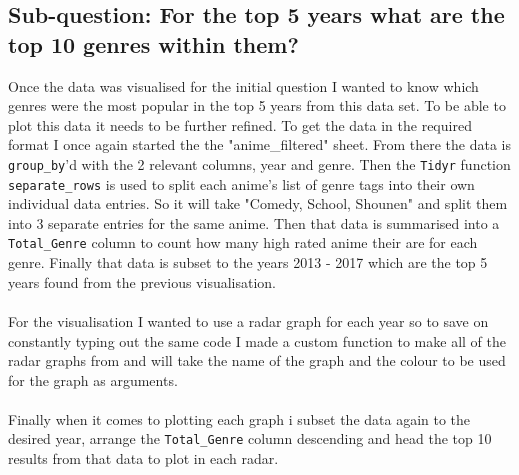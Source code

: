 \documentclass[a4paper]{article}
\begin{document}
	\pagebreak
	
	\subsection*{Sub-question: For the top 5 years what are the top 10 genres within them?}
	Once the data was visualised for the initial question I wanted to know which genres were the most popular in the top 5 years from this data set. To be able to plot this data it needs to be further refined. To get the data in the required format I once again started the the "anime\_filtered" sheet. From there the data is \texttt{group\_by}'d with the 2 relevant columns, year and genre. Then the \texttt{Tidyr} function \texttt{separate\_rows} is used to split each anime's list of genre tags into their own individual data entries. So it will take "Comedy, School, Shounen" and split them into 3 separate entries for the same anime. Then that data is summarised into a \texttt{Total\_Genre} column to count how many high rated anime their are for each genre. Finally that data is subset to the years 2013 - 2017 which are the top 5 years found from the previous visualisation.\\
	\\
	For the visualisation I wanted to use a radar graph for each year so to save on constantly typing out the same code I made a custom function to make all of the radar graphs from and will take the name of the graph and the colour to be used for the graph as arguments.\\
	\\
	Finally when it comes to plotting each graph i subset the data again to the desired year, arrange the \texttt{Total\_Genre} column descending and head the top 10 results from that data to plot in each radar.\\
	
\end{document}
